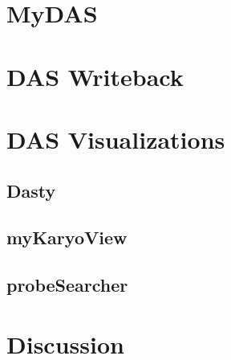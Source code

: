 \textbf{}



\section{MyDAS} \label{section:mydas}
\section{DAS Writeback}
\section{DAS Visualizations}
\subsection{Dasty} \label{section:dasty}
\subsection{myKaryoView}\label{section:mykarioview}
\subsection{probeSearcher}
\section{Discussion}